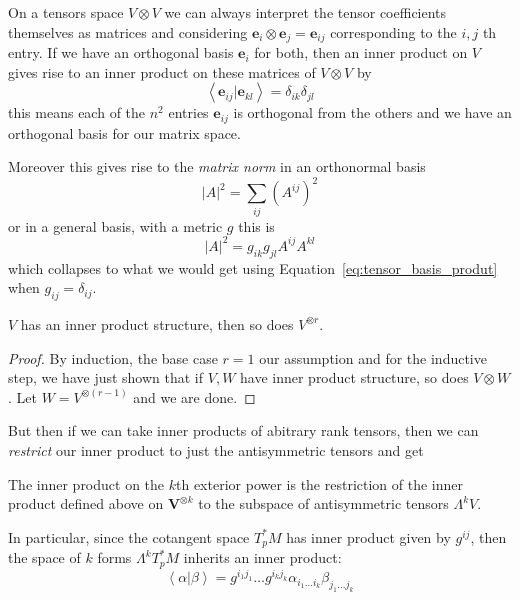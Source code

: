 	\begin{example}
		On a tensors space $V \otimes V$ we can always interpret the tensor coefficients themselves as matrices and considering $\mathbf e_i \otimes \mathbf e_j = \mathbf e_{ij}$ corresponding to the $i,j$ th entry. If we have an orthogonal basis $\mathbf e_i$ for both, then an inner product on $V$ gives rise to an inner product on these matrices of $V \otimes V$ by
		\begin{equation}\label{eq:tensor_basis_produt}
			\left< \mathbf e_{ij} | \mathbf e_{kl} \right> = \delta_{ik} \delta_{jl}
		\end{equation}
		this means each of the $n^2$ entries $\mathbf e_{ij}$ is orthogonal from the others and we have an orthogonal basis for our matrix space.
	\end{example}
	Moreover this gives rise to the \emph{matrix norm} in an orthonormal basis
	\begin{equation}
		|A|^2 = \sum_{ij} (A^{ij})^2
	\end{equation}
	or in a general basis, with a metric $g$ this is 
	\begin{equation}
		|A|^2 = g_{i k} g_{j l} A^{i j} A^{k l}
	\end{equation}
	which collapses to what we would get using Equation~\eqref{eq:tensor_basis_produt} when $g_{ij} = \delta_{ij}$. 
	\begin{prop}
		$V$ has an inner product structure, then so does $V^{\otimes r}$.
	\end{prop}
	\begin{proof}
		By induction, the base case $r=1$ our assumption and for the inductive step, we have just shown that if $V,W$ have inner product structure, so does $V \otimes W$. Let $W = V^{\otimes(r-1)}$ and we are done.
	\end{proof}
	
	But then if we can take inner products of abitrary rank tensors, then we can \emph{restrict} our inner product to just the antisymmetric tensors and get

	\begin{defn}
		The inner product on the $k$th exterior power is the restriction of the inner product defined above on $\mathbf V^{\otimes k}$ to the subspace of antisymmetric tensors $\Lambda^k V$.
		
		In particular, since the cotangent space $T^*_pM$ has inner product given by $g^{ij}$, then the space of $k$ forms $\Lambda^k T^*_pM$ inherits an inner product:
		\begin{equation}
			\left< \alpha | \beta \right> = g^{i_1 j_1} \dots g^{i_k j_k} \alpha_{i_1\dots i_k} \beta_{j_1 \dots j_k}
		\end{equation}
	\end{defn}
	
